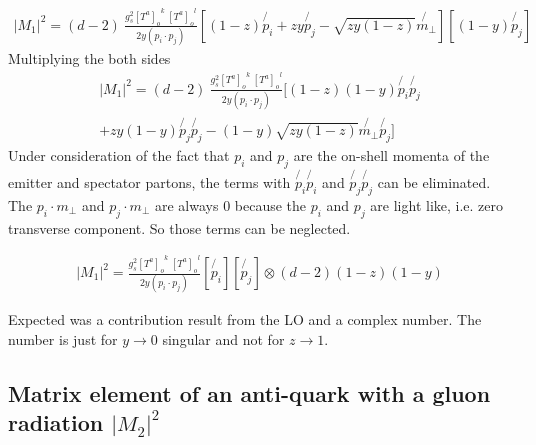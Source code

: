\begin{equation}
\begin{split}
|M_1|^2=(d-2)\:\frac{g_s^2  {[T^a]_{o}}^k \: {[T^a]_o}^l }{2y(p_i \cdot p_j)}
[(1-z) \not{p_i}+zy \not{p_j} - \sqrt{zy(1-z)} \not{{m}_{\bot}}]
[(1-y) \not{p_j}]
\end{split}
\end{equation}
Multiplying the both sides 
\begin{equation}
\begin{split}
|M_1|^2=(d-2)\:\frac{g_s^2  {[T^a]_{o}}^k \: {[T^a]_o}^l }{2y(p_i \cdot p_j)}
[(1-z)(1-y) \not{p_i}\not{p_j} \\
+zy(1-y) \not{p_j}\not{p_j} - (1-y)\sqrt{zy(1-z)} \not{{m}_{\bot}}\not{p_j}]
\end{split}
\end{equation}
Under consideration of the fact that $ p_i $ and $ p_j $ are the on-shell momenta of the emitter and spectator partons, the terms with $ \not{p_i} \not{p_i} $ and $ \not{p_j} \not{p_j} $ can be eliminated.
The $ {p_i} \cdot  {m}_{\bot} $ and $ {p_j} \cdot  {m}_{\bot} $ are always $ 0 $ because the $ p_i $ and $ p_j $ are light like, i.e. zero transverse component. So those terms can be neglected.


\begin{equation}
\begin{split}
|M_1|^2=\frac{g_s^2  {[T^a]_{o}}^k \: {[T^a]_o}^l }{2y(p_i \cdot p_j)}
[\not{p_i}][\not{p_j}]\otimes(d-2)(1-z)(1-y)
\end{split}
\end{equation}

Expected was a contribution result from the LO and a complex number. The number is just for $ y \rightarrow 0 $ singular and not for $ z \rightarrow 1 $.

\newpage

\subsection{Matrix element of an anti-quark with a gluon radiation $ |M_2|^2 $}

